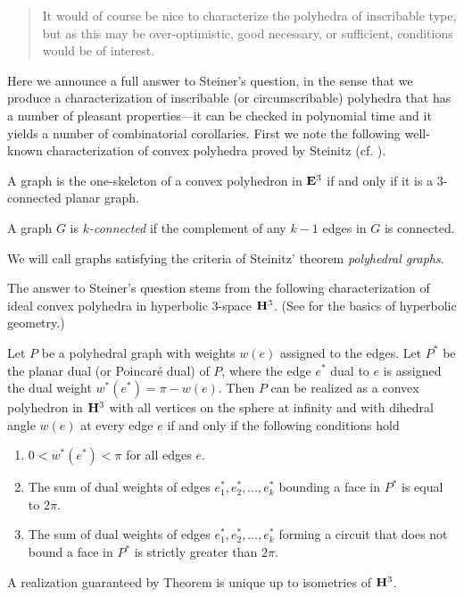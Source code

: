 \begin{quote}
It would of course be nice to characterize the polyhedra of
inscribable type, but as this may be over-optimistic, good 
necessary,
or sufficient, conditions would be of interest.
\end{quote}

Here we announce a full answer to Steiner's question, in 
the sense
that we produce a characterization of inscribable (or
circumscribable) polyhedra that has a number of pleasant 
properties---it
can be checked in polynomial time and it yields a number of
combinatorial corollaries. First we note the following 
well-known
characterization of convex polyhedra proved by Steinitz (cf.
\cite{gru:conp}).

\begin{Steinitz}
A graph is the one-skeleton of a convex
polyhedron in $\bold{E}^3$ if and only if it is
a $3$-connected planar graph.
\end{Steinitz}

\begin{Note}
A graph $G$ is {\em $k$-connected} if the complement of any
$k-1$ edges in $G$ is connected.

We will call graphs satisfying the criteria of Steinitz' 
theorem {\em
polyhedral graphs}.

The answer to Steiner's question  stems from the following
characterization of ideal convex polyhedra in hyperbolic 
3-space $\bold{H}^3$.
(See \cite{th:gt3m, bear:grps} for the basics of hyperbolic
geometry.) 
\end{Note}
\begin{Theorem}
Let $P$ be a polyhedral graph  with weights $w(e)$ 
assigned to the
edges. Let $P^*$ be the planar dual \RM(or Poincar\'e 
dual\/\RM) 
of $P$, where the edge $e^*$ dual to $e$ is assigned the 
dual weight
$w^*(e^*)= \pi - w(e)$. Then $P$ can be realized as a convex
polyhedron in $\bold{H}^3$ with all vertices on the sphere at 
infinity and
with dihedral angle $w(e)$ at every edge $e$ if and only 
if the
following conditions hold\/\rom{:}
\begin{enumerate}
\item{} $0<w^*(e^*)<\pi$ for all edges $e$.
\item{} The sum of dual weights of edges $e_1^*, e_2^*, 
\dots,
e_k^*$ bounding a face in $P^*$ is equal to $2\pi$.
\item{} The sum of dual weights of edges $e_1^*, e_2^*, 
\dots,
e_k^*$ forming a circuit that does not bound a face in 
$P^*$ is strictly
greater than $2\pi$.
\end{enumerate}
\end{Theorem}
\begin{Theorem}
A realization guaranteed by Theorem  is unique up to 
isometries of
$\bold{H}^3$. 
\end{Theorem}

